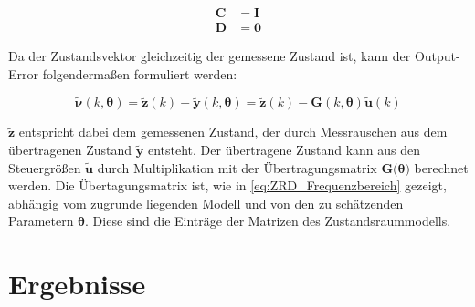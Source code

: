 \begin{align}
	\mathbf{C} &= \mathbf{I} \nonumber \\
 	\mathbf{D} &= \mathbf{0}          
	\label{eq:CD}
\end{align}

Da der Zustandsvektor gleichzeitig der gemessene Zustand ist, kann der Output-Error folgendermaßen formuliert werden:

\begin{equation}
    \mathbf{\tilde{\nu}}(k,\mathbf{\theta}) = \mathbf{\tilde{z}}(k)-\mathbf{\tilde{y}}(k,\mathbf{\theta}) = \mathbf{\tilde{z}}(k)-\mathbf{G}(k,\mathbf{\theta})\mathbf{\tilde{u}}(k)  
	\label{eq:Output_Error}
\end{equation}

$\mathbf{\tilde{z}}$ entspricht dabei dem gemessenen Zustand, der durch Messrauschen aus dem übertragenen Zustand 
$\mathbf{\tilde{y}}$ entsteht. Der übertragene Zustand kann aus den Steuergrößen $\mathbf{\tilde{u}}$ durch Multiplikation 
mit der Übertragungsmatrix $\mathbf{G}(\mathbf{\theta)}$ berechnet werden. Die Übertagungsmatrix ist, wie in 
\cref{eq:ZRD_Frequenzbereich} gezeigt, abhängig vom zugrunde liegenden Modell und von den zu schätzenden Parametern 
$\mathbf{\theta}$. Diese sind die Einträge der Matrizen des Zustandsraummodells.   


\section{Ergebnisse}